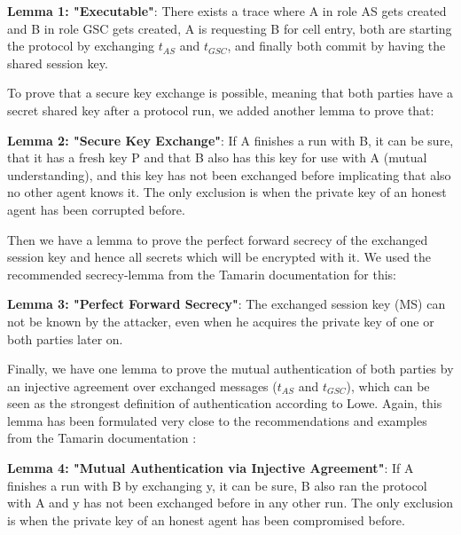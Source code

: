 \textbf{Lemma 1: "Executable"}:
There exists a trace where A in role AS gets created and B in role GSC gets created, A is requesting B for cell entry, both are starting the protocol by exchanging $t_{AS}$ and $t_{GSC}$, and finally both commit by having the shared session key.
\vspace{0.5em}

To prove that a secure key exchange is possible, meaning that both parties have a secret shared key after a protocol run, we added another lemma to prove that:

\textbf{Lemma 2: "Secure Key Exchange"}:
If A finishes a run with B, it can be sure, that it has a fresh key P and that B also has this key for use with A (mutual understanding), and this key has not been exchanged before implicating that also no other agent knows it. The only exclusion is when the private key of an honest agent has been corrupted before.
\vspace{0.5em}

Then we have a lemma to prove the perfect forward secrecy of the exchanged session key and hence all secrets which will be encrypted with it. We used the recommended secrecy-lemma from the Tamarin documentation for this:

\textbf{Lemma 3: "Perfect Forward Secrecy"}:
The exchanged session key (MS) can not be known by the attacker, even when he acquires the private key of one or both parties later on.
\vspace{0.5em}
 
Finally, we have one lemma to prove the mutual authentication of both parties by an injective agreement over exchanged messages ($t_{AS}$ and $t_{GSC}$), which can be seen as the strongest definition of authentication according to Lowe\cite{lowe1997}. Again, this lemma has been formulated very close to the recommendations and examples from the Tamarin documentation \cite{tamarinDoc2020}:

\textbf{Lemma 4: "Mutual Authentication via Injective Agreement"}:
If A finishes a run with B by exchanging y, it can be sure, B also ran the protocol with A and y has not been exchanged before in any other run. The only exclusion is when the private key of an honest agent has been compromised before. 
